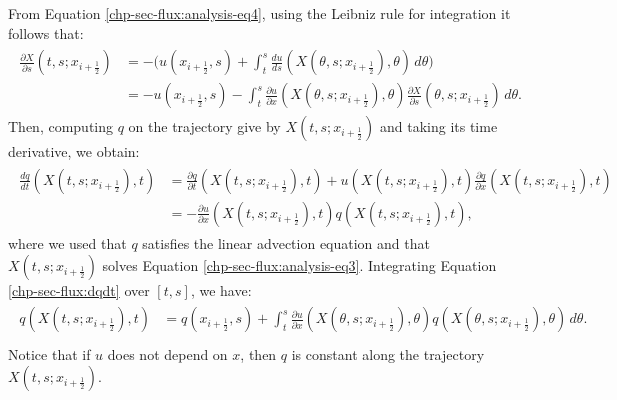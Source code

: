From Equation \eqref{chp-sec-flux:analysis-eq4}, using the Leibniz rule for integration it follows that:
\begin{align}
	\begin{split}
		\label{chp-sec-flux:dxds}
		\frac{\partial X}{\partial s} (t,s;x_{i+\frac{1}{2}}) &= - \bigg(u(x_{i+\frac{1}{2}},s) + 
		\int_{t}^{s} \frac{du}{ds}(X(\theta,s;x_{i+\frac{1}{2}}),\theta) \,d\theta \bigg)\\
		&=- u(x_{i+\frac{1}{2}},s) -
		\int_{t}^{s} \frac{\partial u}{\partial x}(X(\theta, s; x_{i+\frac{1}{2}}),\theta) 
		\frac{\partial X}{\partial s} (\theta, s; x_{i+\frac{1}{2}})\,d\theta.
	\end{split}
\end{align}
Then, computing $q$ on the trajectory give by $X(t,s;x_{i+\frac{1}{2}})$ and taking
its time derivative, we obtain:
\begin{align}
	\label{chp-sec-flux:dqdt}
	\begin{split}
		\frac{dq}{dt} (X(t,s;x_{i+\frac{1}{2}}),t) &= 
		\frac{\partial q}{\partial t} (X(t,s;x_{i+\frac{1}{2}}),t)+
		u (X(t,s;x_{i+\frac{1}{2}}),t)\frac{\partial q}{\partial x} (X(t,s;x_{i+\frac{1}{2}}),t) \\
		&= -\frac{\partial u}{\partial x}(X(t,s;x_{i+\frac{1}{2}}),t)  q (X(t,s;x_{i+\frac{1}{2}}),t),
	\end{split}
\end{align}
where we used that $q$ satisfies the linear advection equation and that $X(t,s;x_{i+\frac{1}{2}})$
solves Equation \eqref{chp-sec-flux:analysis-eq3}.
Integrating Equation \eqref{chp-sec-flux:dqdt} over $[t,s]$, we have:
\begin{align}
	\begin{split}
		\label{chp-sec-flux:q_int}
		q(X(t,s;x_{i+\frac{1}{2}}),t) &= q(x_{i+\frac{1}{2}},s)
		+ \int_{t}^{s} \frac{\partial u}{\partial x}(X(\theta,s;x_{i+\frac{1}{2}}),\theta) q(X(\theta,s;x_{i+\frac{1}{2}}),\theta) \,d\theta. \\
	\end{split}
\end{align}
Notice that if $u$ does not depend on $x$, then $q$ is constant along the trajectory $X(t,s;x_{i+\frac{1}{2}})$.

